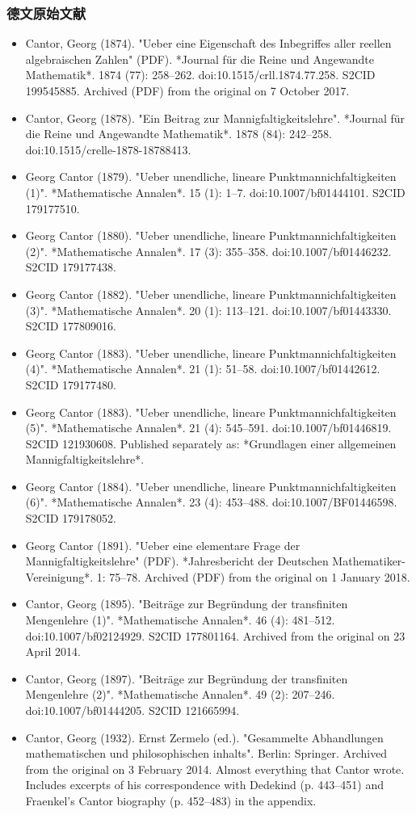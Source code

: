 \subsubsection{德文原始文献 } 
\begin{itemize}
\item Cantor, Georg (1874). "Ueber eine Eigenschaft des Inbegriffes aller reellen algebraischen Zahlen" (PDF). *Journal für die Reine und Angewandte Mathematik*. 1874 (77): 258–262. doi:10.1515/crll.1874.77.258. S2CID 199545885. Archived (PDF) from the original on 7 October 2017.  
\item Cantor, Georg (1878). "Ein Beitrag zur Mannigfaltigkeitslehre". *Journal für die Reine und Angewandte Mathematik*. 1878 (84): 242–258. doi:10.1515/crelle-1878-18788413.  
\item Georg Cantor (1879). "Ueber unendliche, lineare Punktmannichfaltigkeiten (1)". *Mathematische Annalen*. 15 (1): 1–7. doi:10.1007/bf01444101. S2CID 179177510.  
\item Georg Cantor (1880). "Ueber unendliche, lineare Punktmannichfaltigkeiten (2)". *Mathematische Annalen*. 17 (3): 355–358. doi:10.1007/bf01446232. S2CID 179177438.  
\item Georg Cantor (1882). "Ueber unendliche, lineare Punktmannichfaltigkeiten (3)". *Mathematische Annalen*. 20 (1): 113–121. doi:10.1007/bf01443330. S2CID 177809016.  
\item Georg Cantor (1883). "Ueber unendliche, lineare Punktmannichfaltigkeiten (4)". *Mathematische Annalen*. 21 (1): 51–58. doi:10.1007/bf01442612. S2CID 179177480.  
\item Georg Cantor (1883). "Ueber unendliche, lineare Punktmannichfaltigkeiten (5)". *Mathematische Annalen*. 21 (4): 545–591. doi:10.1007/bf01446819. S2CID 121930608. Published separately as: *Grundlagen einer allgemeinen Mannigfaltigkeitslehre*.  
\item Georg Cantor (1884). "Ueber unendliche, lineare Punktmannichfaltigkeiten (6)". *Mathematische Annalen*. 23 (4): 453–488. doi:10.1007/BF01446598. S2CID 179178052.  
\item Georg Cantor (1891). "Ueber eine elementare Frage der Mannigfaltigkeitslehre" (PDF). *Jahresbericht der Deutschen Mathematiker-Vereinigung*. 1: 75–78. Archived (PDF) from the original on 1 January 2018.  
\item Cantor, Georg (1895). "Beiträge zur Begründung der transfiniten Mengenlehre (1)". *Mathematische Annalen*. 46 (4): 481–512. doi:10.1007/bf02124929. S2CID 177801164. Archived from the original on 23 April 2014.  
\item Cantor, Georg (1897). "Beiträge zur Begründung der transfiniten Mengenlehre (2)". *Mathematische Annalen*. 49 (2): 207–246. doi:10.1007/bf01444205. S2CID 121665994.  
\item Cantor, Georg (1932). Ernst Zermelo (ed.). "Gesammelte Abhandlungen mathematischen und philosophischen inhalts". Berlin: Springer. Archived from the original on 3 February 2014. Almost everything that Cantor wrote. Includes excerpts of his correspondence with Dedekind (p. 443–451) and Fraenkel's Cantor biography (p. 452–483) in the appendix.  
\end{itemize}
